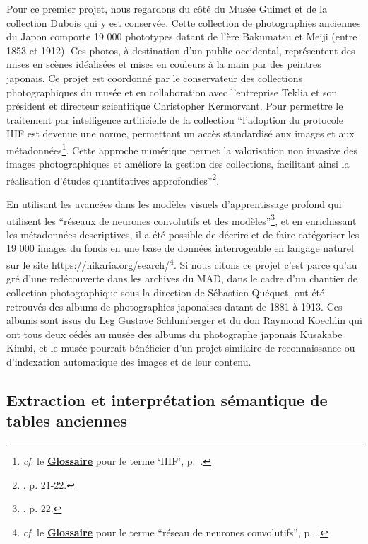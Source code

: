 Pour ce premier projet, nous regardons du côté du Musée Guimet et de la collection Dubois qui y est conservée. Cette collection de photographies anciennes du Japon comporte 19 000 phototypes datant de l'ère Bakumatsu et Meiji (entre 1853 et 1912). Ces photos, à destination d'un public occidental, représentent des mises en scènes idéalisées et mises en couleurs à la main par des peintres japonais. Ce projet est coordonné par le conservateur des collections photographiques du musée et en collaboration avec l'entreprise Teklia et son président et directeur scientifique Christopher Kermorvant. Pour permettre le traitement par intelligence artificielle de la collection \enquote{l’adoption du protocole IIIF est devenue une norme, permettant un accès standardisé aux images et aux métadonnées\footnote{\textit{cf}. le \textbf{\hyperref[sec:Glossaire]{Glossaire}} pour le terme \enquote{IIIF}, p.~\pageref{sec:Glossaire}.}. Cette approche numérique permet la valorisation non invasive des images photographiques et améliore la gestion des collections, facilitant ainsi la réalisation d’études quantitatives approfondies}\footnote{\cite{saint-ours_de_projet_2024}. p. 21-22.}. 

En utilisant les avancées dans les modèles visuels d'apprentissage profond qui utilisent les \enquote{réseaux de neurones convolutifs et des modèles}\footnote{\cite{saint-ours_de_projet_2024}. p. 22.}, et en enrichissant les métadonnées descriptives, il a été possible de décrire et de faire catégoriser les 19 000 images du fonds en une base de données interrogeable en langage naturel sur le site \url{https://hikaria.org/search/}\footnote{\textit{cf}. le \textbf{\hyperref[sec:Glossaire]{Glossaire}} pour le terme \enquote{réseau de neurones convolutifs}, p.~\pageref{sec:Glossaire}.}. Si nous citons ce projet c'est parce qu'au gré d'une redécouverte dans les archives du MAD, dans le cadre d'un chantier de collection photographique sous la direction de Sébastien Quéquet, ont été retrouvés des albums de photographies japonaises datant de 1881 à 1913. Ces albums sont issus du Leg Gustave Schlumberger et du don Raymond Koechlin qui ont tous deux cédés au musée des albums du photographe japonais Kusakabe Kimbi, et le musée pourrait bénéficier d'un projet similaire de reconnaissance ou d'indexation automatique des images et de leur contenu. 

\subsection{Extraction et interprétation sémantique de tables anciennes}

